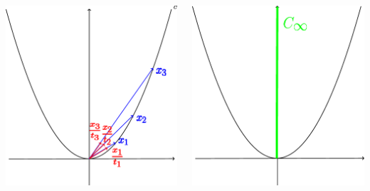 \documentclass[aspectratio=169, dvipdfmx, 11pt]{beamer} %
\begin{document}
\begin{frame}{}
    \centering
    \begin{columns}
        \pause
        \begin{column}{0.48\textwidth}
        \centering
        \includegraphics[keepaspectratio, scale=0.095]{figures/figure_asymptotic_cone_1.eps}
        \end{column}
        \pause
        \begin{column}{0.48\textwidth}
        \centering
        \includegraphics[keepaspectratio, scale=0.095]{figures/figure_asymptotic_cone_2.eps}
        \end{column}
    \end{columns}
\end{frame}
\end{document}
